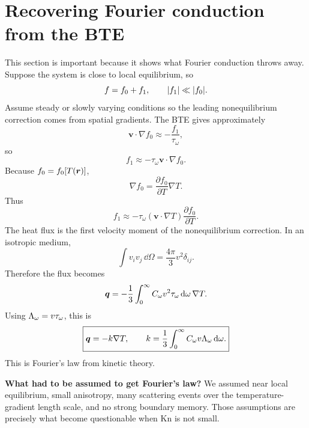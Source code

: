 \documentclass[11pt]{article}
\begin{document}
\section{Recovering Fourier conduction from the BTE}
This section is important because it shows what Fourier conduction throws away. Suppose the system is close to local equilibrium, so
\begin{equation}
    f=f_0+f_1,
    \qquad
    \abs{f_1}\ll\abs{f_0}.
\end{equation}
Assume steady or slowly varying conditions so the leading nonequilibrium correction comes from spatial gradients. The BTE gives approximately
\begin{equation}
    \bm{v}\cdot\nabla f_0\approx -\frac{f_1}{\tau_\omega},
\end{equation}
so
\begin{equation}
    f_1\approx -\tau_\omega\bm{v}\cdot\nabla f_0.
    \label{eq:f1_fourier}
\end{equation}
Because \(f_0=f_0[T(\bm{r})]\),
\begin{equation}
    \nabla f_0=\frac{\partial f_0}{\partial T}\nabla T.
\end{equation}
Thus
\begin{equation}
    f_1\approx -\tau_\omega(\bm{v}\cdot\nabla T)\frac{\partial f_0}{\partial T}.
\end{equation}
The heat flux is the first velocity moment of the nonequilibrium correction. In an isotropic medium,
\begin{equation}
    \int v_i v_j\,\dd\Omega = \frac{4\pi}{3}v^2\delta_{ij}.
\end{equation}
Therefore the flux becomes
\begin{equation}
    \bm{q}=-\frac{1}{3}\int_0^\infty C_\omega v^2\tau_\omega\,\dd\omega\,\nabla T.
\end{equation}
Using \(\Lambda_\omega=v\tau_\omega\), this is
\begin{equation}
    \boxed{\bm{q}=-k\nabla T,\qquad
    k=\frac{1}{3}\int_0^\infty C_\omega v\Lambda_\omega\,\dd\omega.}
    \label{eq:kinetic_k}
\end{equation}
This is Fourier's law from kinetic theory.

\begin{physicsbox}
\textbf{What had to be assumed to get Fourier's law?} We assumed near local equilibrium, small anisotropy, many scattering events over the temperature-gradient length scale, and no strong boundary memory. Those assumptions are precisely what become questionable when \(\mathrm{Kn}\) is not small.
\end{physicsbox}
\end{document}

